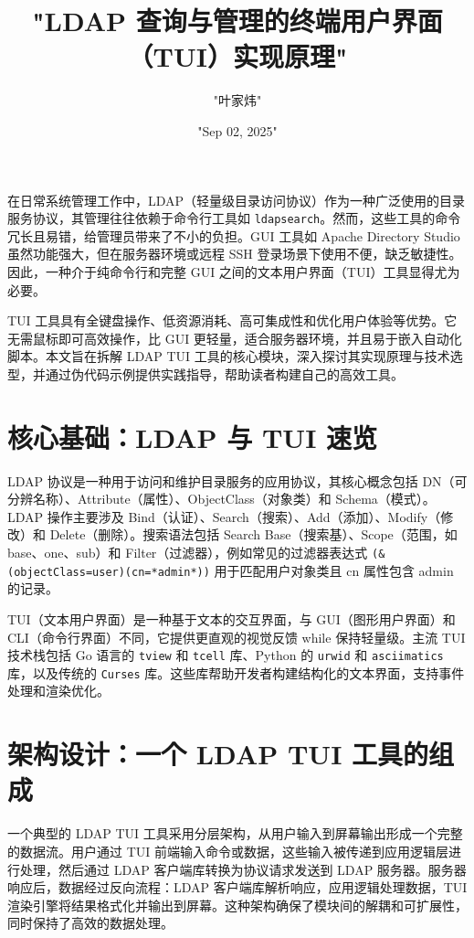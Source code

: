 \title{"LDAP 查询与管理的终端用户界面（TUI）实现原理"}
\author{"叶家炜"}
\date{"Sep 02, 2025"}
\maketitle
在日常系统管理工作中，LDAP（轻量级目录访问协议）作为一种广泛使用的目录服务协议，其管理往往依赖于命令行工具如 \texttt{ldapsearch}。然而，这些工具的命令冗长且易错，给管理员带来了不小的负担。GUI 工具如 Apache Directory Studio 虽然功能强大，但在服务器环境或远程 SSH 登录场景下使用不便，缺乏敏捷性。因此，一种介于纯命令行和完整 GUI 之间的文本用户界面（TUI）工具显得尤为必要。\par
TUI 工具具有全键盘操作、低资源消耗、高可集成性和优化用户体验等优势。它无需鼠标即可高效操作，比 GUI 更轻量，适合服务器环境，并且易于嵌入自动化脚本。本文旨在拆解 LDAP TUI 工具的核心模块，深入探讨其实现原理与技术选型，并通过伪代码示例提供实践指导，帮助读者构建自己的高效工具。\par
\chapter{核心基础：LDAP 与 TUI 速览}
LDAP 协议是一种用于访问和维护目录服务的应用协议，其核心概念包括 DN（可分辨名称）、Attribute（属性）、ObjectClass（对象类）和 Schema（模式）。LDAP 操作主要涉及 Bind（认证）、Search（搜索）、Add（添加）、Modify（修改）和 Delete（删除）。搜索语法包括 Search Base（搜索基）、Scope（范围，如 base、one、sub）和 Filter（过滤器），例如常见的过滤器表达式 \texttt{(\&{}(objectClass=user)(cn=*admin*))} 用于匹配用户对象类且 cn 属性包含 admin 的记录。\par
TUI（文本用户界面）是一种基于文本的交互界面，与 GUI（图形用户界面）和 CLI（命令行界面）不同，它提供更直观的视觉反馈 while 保持轻量级。主流 TUI 技术栈包括 Go 语言的 \texttt{tview} 和 \texttt{tcell} 库、Python 的 \texttt{urwid} 和 \texttt{asciimatics} 库，以及传统的 \texttt{Curses} 库。这些库帮助开发者构建结构化的文本界面，支持事件处理和渲染优化。\par
\chapter{架构设计：一个 LDAP TUI 工具的组成}
一个典型的 LDAP TUI 工具采用分层架构，从用户输入到屏幕输出形成一个完整的数据流。用户通过 TUI 前端输入命令或数据，这些输入被传递到应用逻辑层进行处理，然后通过 LDAP 客户端库转换为协议请求发送到 LDAP 服务器。服务器响应后，数据经过反向流程：LDAP 客户端库解析响应，应用逻辑处理数据，TUI 渲染引擎将结果格式化并输出到屏幕。这种架构确保了模块间的解耦和可扩展性，同时保持了高效的数据处理。\par
